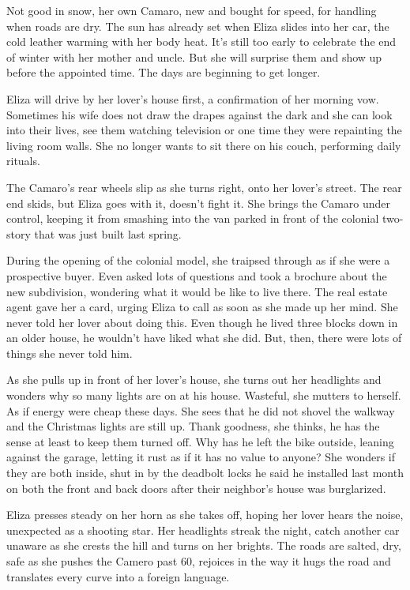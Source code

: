 \documentclass[twoside,10pt]{book}
\begin{document}
Not good in snow, her own Camaro, new and bought for speed, for handling
when roads are dry. The sun has already set when Eliza slides into her
car, the cold leather warming with her body heat. It's still too early
to celebrate the end of winter with her mother and uncle. But she will
surprise them and show up before the appointed time. The days are
beginning to get longer.

Eliza will drive by her lover's house first, a confirmation of her
morning vow. Sometimes his wife does not draw the drapes against the
dark and she can look into their lives, see them watching television or
one time they were repainting the living room walls. She no longer wants
to sit there on his couch, performing daily rituals.

The Camaro's rear wheels slip as she turns right, onto her lover's
street. The rear end skids, but Eliza goes with it, doesn't fight it.
She brings the Camaro under control, keeping it from smashing into the
van parked in front of the colonial two-story that was just built last
spring.

During the opening of the colonial model, she traipsed through as if she
were a prospective buyer. Even asked lots of questions and took a
brochure about the new subdivision, wondering what it would be like to
live there. The real estate agent gave her a card, urging Eliza to call
as soon as she made up her mind. She never told her lover about doing
this. Even though he lived three blocks down in an older house, he
wouldn't have liked what she did. But, then, there were lots of things
she never told him.

As she pulls up in front of her lover's house, she turns out her
headlights and wonders why so many lights are on at his house. Wasteful,
she mutters to herself. As if energy were cheap these days. She sees
that he did not shovel the walkway and the Christmas lights are still
up. Thank goodness, she thinks, he has the sense at least to keep them
turned off. Why has he left the bike outside, leaning against the
garage, letting it rust as if it has no value to anyone? She wonders if
they are both inside, shut in by the deadbolt locks he said he installed
last month on both the front and back doors after their neighbor's house
was burglarized.

Eliza presses steady on her horn as she takes off, hoping her lover
hears the noise, unexpected as a shooting star. Her headlights streak
the night, catch another car unaware as she crests the hill and turns on
her brights. The roads are salted, dry, safe as she pushes the Camero
past 60, rejoices in the way it hugs the road and translates every curve
into a foreign language.
\end{document}
